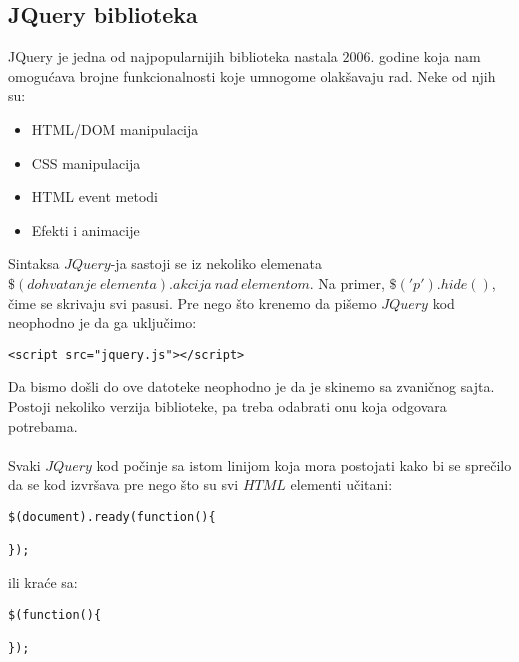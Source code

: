 \subsection{JQuery biblioteka}

JQuery je jedna od najpopularnijih biblioteka nastala $2006.$ godine koja nam omogućava brojne funkcionalnosti koje umnogome olakšavaju rad. Neke od njih su:
\begin{itemize}
\item HTML/DOM manipulacija
\item CSS manipulacija
\item HTML event metodi
\item Efekti i animacije
\end{itemize} 

Sintaksa $JQuery$-ja sastoji se iz nekoliko elemenata $\$(dohvatanje\ elementa).akcija\ nad\ elementom$. Na primer, $\$('p').hide()$, čime se skrivaju svi pasusi. 
Pre nego što krenemo da pišemo $JQuery$ kod neophodno je da ga uključimo:
\begin{verbatim}
<script src="jquery.js"></script>
\end{verbatim}
Da bismo došli do ove datoteke neophodno je da je skinemo sa zvaničnog sajta. Postoji nekoliko verzija biblioteke, pa treba odabrati onu koja odgovara potrebama.
\\\\
Svaki $JQuery$ kod počinje sa istom linijom koja mora postojati kako bi se sprečilo da se kod izvršava pre nego što su svi $HTML$ elementi učitani:
\begin{verbatim}
$(document).ready(function(){

});
\end{verbatim}
ili kraće sa:
\begin{verbatim}
$(function(){

});
\end{verbatim}

